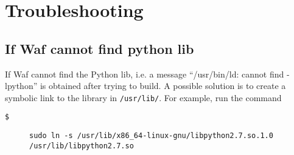 \section{Troubleshooting \label{sec:Troubleshooting}}


\subsection{If Waf cannot find python lib}

If Waf cannot find the Python lib, i.e. a message ``/usr/bin/ld:
cannot find -lpython'' is obtained after trying to build. A possible
solution is to create a symbolic link to the library in \texttt{/usr/lib/}.
For example, run the command
\begin{description}
\item [{\texttt{\$}}] \texttt{sudo ln -s /usr/lib/x86\_64-linux-gnu/libpython2.7.so.1.0
/usr/lib/libpython2.7.so }\end{description}
